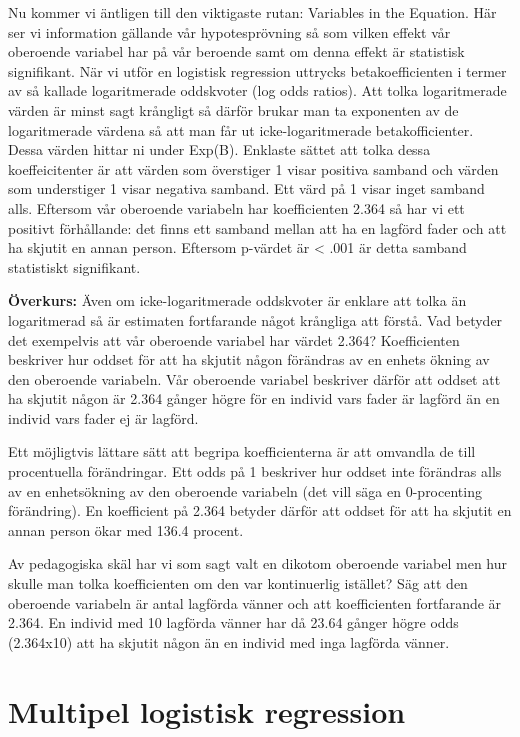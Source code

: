 \documentclass[
]{book}
\begin{document}
Nu kommer vi äntligen till den viktigaste rutan: Variables in the Equation. Här ser vi information gällande vår hypotesprövning så som vilken effekt vår oberoende variabel har på vår beroende samt om denna effekt är statistisk signifikant. När vi utför en logistisk regression uttrycks betakoefficienten i termer av så kallade logaritmerade oddskvoter (log odds ratios). Att tolka logaritmerade värden är minst sagt krångligt så därför brukar man ta exponenten av de logaritmerade värdena så att man får ut icke-logaritmerade betakofficienter. Dessa värden hittar ni under Exp(B). Enklaste sättet att tolka dessa koeffeicitenter är att värden som överstiger 1 visar positiva samband och värden som understiger 1 visar negativa samband. Ett värd på 1 visar inget samband alls. Eftersom vår oberoende variabeln har koefficienten 2.364 så har vi ett positivt förhållande: det finns ett samband mellan att ha en lagförd fader och att ha skjutit en annan person. Eftersom p-värdet är \textless{} .001 är detta samband statistiskt signifikant.

\textbf{Överkurs:} Även om icke-logaritmerade oddskvoter är enklare att tolka än logaritmerad så är estimaten fortfarande något krångliga att förstå. Vad betyder det exempelvis att vår oberoende variabel har värdet 2.364? Koefficienten beskriver hur oddset för att ha skjutit någon förändras av en enhets ökning av den oberoende variabeln. Vår oberoende variabel beskriver därför att oddset att ha skjutit någon är 2.364 gånger högre för en individ vars fader är lagförd än en individ vars fader ej är lagförd.

Ett möjligtvis lättare sätt att begripa koefficienterna är att omvandla de till procentuella förändringar. Ett odds på 1 beskriver hur oddset inte förändras alls av en enhetsökning av den oberoende variabeln (det vill säga en 0-procenting förändring). En koefficient på 2.364 betyder därför att oddset för att ha skjutit en annan person ökar med 136.4 procent.

Av pedagogiska skäl har vi som sagt valt en dikotom oberoende variabel men hur skulle man tolka koefficienten om den var kontinuerlig istället? Säg att den oberoende variabeln är antal lagförda vänner och att koefficienten fortfarande är 2.364. En individ med 10 lagförda vänner har då 23.64 gånger högre odds (2.364x10) att ha skjutit någon än en individ med inga lagförda vänner.

\hypertarget{multipel-logistisk-regression}{%
\section{Multipel logistisk regression}\label{multipel-logistisk-regression}}
\end{document}
